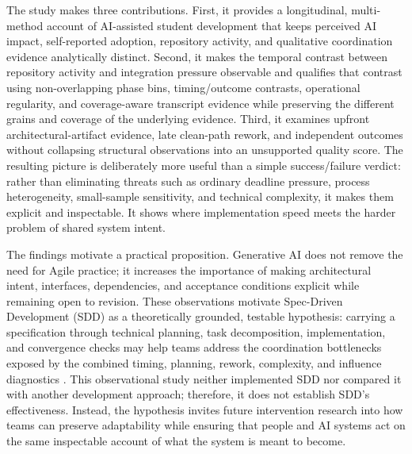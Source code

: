 The study makes three contributions. First, it provides a longitudinal,
multi-method account of AI-assisted student development that keeps perceived
AI impact, self-reported adoption, repository activity, and qualitative
coordination evidence analytically distinct. Second, it makes the temporal
contrast between repository activity and integration pressure observable and
qualifies that contrast using non-overlapping phase bins, timing/outcome
contrasts, operational regularity, and coverage-aware transcript evidence while
preserving the different grains and coverage of the underlying evidence.
Third, it examines upfront architectural-artifact evidence, late clean-path
rework, and independent outcomes without collapsing structural observations
into an unsupported quality score. The resulting picture is deliberately more
useful than a simple success/failure verdict: rather than eliminating threats
such as ordinary deadline pressure, process heterogeneity, small-sample
sensitivity, and technical complexity, it makes them explicit and inspectable.
It shows where implementation speed meets the harder problem of shared system
intent.

The findings motivate a practical proposition. Generative AI does not remove
the need for Agile practice; it increases the importance of making architectural
intent, interfaces, dependencies, and acceptance conditions explicit while
remaining open to revision. These observations motivate Spec-Driven
Development (SDD) as a theoretically grounded, testable hypothesis: carrying a
specification through technical planning, task decomposition, implementation,
and convergence checks may help teams address the coordination bottlenecks
exposed by the combined timing, planning, rework, complexity, and influence
diagnostics \cite{github2025spec,thoughtworks202Xspec}. This observational
study neither implemented SDD nor compared it with another development
approach; therefore, it does not establish SDD's effectiveness. Instead, the
hypothesis invites future intervention research into how teams can preserve
adaptability while ensuring that people and AI systems act on the same
inspectable account of what the system is meant to become.

